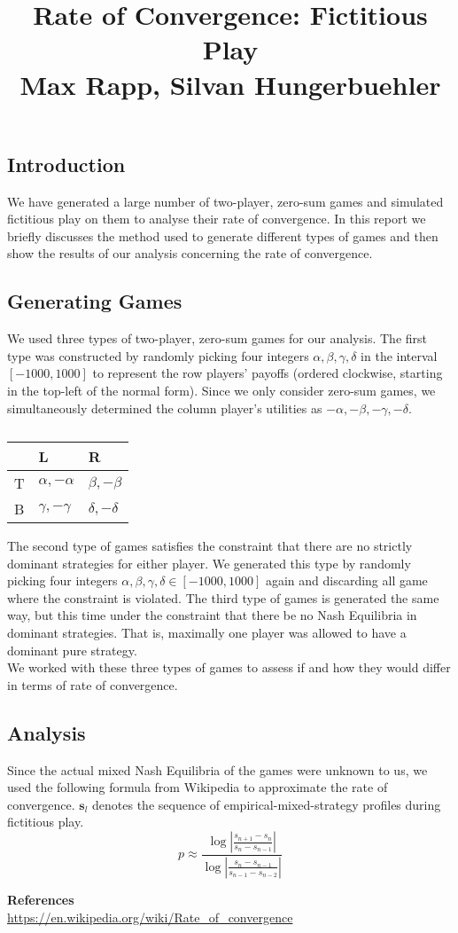 \documentclass[10pt,a4paper]{article}
\title{%
  Rate of Convergence: Fictitious Play \\
  \large Max Rapp, Silvan Hungerbuehler}
\date{}
\begin{document}
\maketitle

\subsection*{Introduction}
We have generated a large number of two-player, zero-sum games and simulated fictitious play on them to analyse their rate of convergence. 
In this report we briefly discusses the method used to generate different types of games and then show the results of our analysis concerning the rate of convergence.
\subsection*{Generating Games}
We used three types of two-player, zero-sum games for our analysis. The first type was constructed by randomly picking four integers  $\alpha,\beta,\gamma,\delta$ in the interval $[-1000,1000]$ to represent the row players' payoffs (ordered clockwise, starting in the top-left of the normal form). Since we only consider zero-sum games, we simultaneously determined the column player's utilities as $-\alpha,-\beta,-\gamma,-\delta$.
\begin{table}[h]
\centering
\caption{}
\begin{tabular}{|l|l|l|}
\hline
  & L                & R                \\ \hline
T & $\alpha,-\alpha$ & $\beta,-\beta$   \\ \hline
B & $\gamma,-\gamma$ & $\delta,-\delta$ \\ \hline
\end{tabular}
\end{table}

The second type of games satisfies the constraint that there are no strictly dominant strategies for either player. We generated this type by randomly picking four integers $\alpha,\beta,\gamma,\delta \in [-1000,1000]$ again and discarding all game where the constraint is violated. The third type of games is generated the same way, but this time under the constraint that there be no Nash Equilibria in dominant strategies. That is, maximally one player was allowed to have a dominant pure strategy.\\
We worked with these three types of games to assess if and how they would differ in terms of rate of convergence.
\subsection*{Analysis}
Since the actual mixed Nash Equilibria of the games were unknown to us, we used the following formula from Wikipedia to approximate the rate of convergence. $\boldsymbol{s}_l$ denotes the sequence of empirical-mixed-strategy profiles during fictitious play.
\begin{equation*}
p\approx\frac{\log{|\frac{s_{n+1}-s_{n}}{s_{n}-s_{n-1}}|}}{\log{|\frac{s_{n}-s_{n-1}}{s_{n-1}-s_{n-2}}|}}
\end{equation*}

\textbf{References}\\
\url{https://en.wikipedia.org/wiki/Rate_of_convergence}
\end{document}
